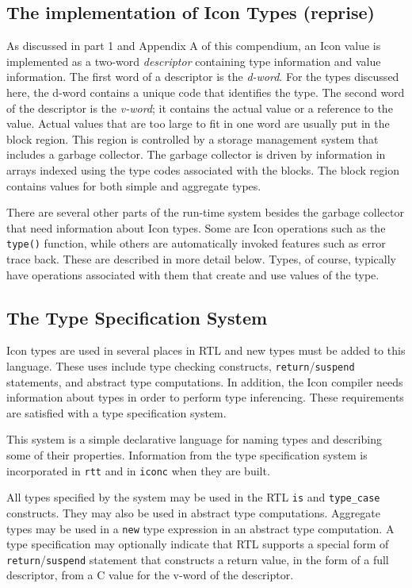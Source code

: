 \subsection{The implementation of Icon Types (reprise)}

As discussed in part 1 and Appendix A of this compendium, an Icon value is
implemented as a two-word \textit{descriptor} containing type information
and value information. The first word of a descriptor is the {\em d-word}.
For the types discussed here, the d-word contains a unique code that
identifies the type. The second word of the descriptor is the {\em v-word};
it contains the actual value or a reference to the value.  Actual values
that are too large to fit in one word are usually put in the block
region. This region is controlled by a storage management system that
includes a garbage collector. The garbage collector is driven by
information in arrays indexed using the type codes associated with the
blocks. The block region contains values for both simple and aggregate
types.

There are several other parts of the run-time system besides the
garbage collector that need information about Icon types. Some are Icon
operations such as the \texttt{type()} function, while others are
automatically invoked features such as error trace back. These are
described in more detail below. Types, of course, typically have operations
associated with them that create and use values of the type.


\subsection{The Type Specification System}

Icon types are used in several places in RTL and new types must be added to
this language. These uses include type checking constructs,
\texttt{return}/\texttt{suspend} statements, and abstract type computations.
In addition, the Icon compiler needs information about types in order to
perform type inferencing. These requirements are satisfied with a type
specification system.

This system is a simple declarative language for naming types and
describing some of their properties. Information from the type
specification system is incorporated in \texttt{rtt} and in \texttt{iconc}
when they are built.

All types specified by the system may be used in the RTL \texttt{is} and
\texttt{type\_case} constructs. They may also be used in abstract type
computations. Aggregate types may be used in a \texttt{new} type expression
in an abstract type computation. A type specification may optionally
indicate that RTL supports a special form of
\texttt{return}/\texttt{suspend} statement that constructs a return value,
in the form of a full descriptor, from a C value for the v-word of the
descriptor.

